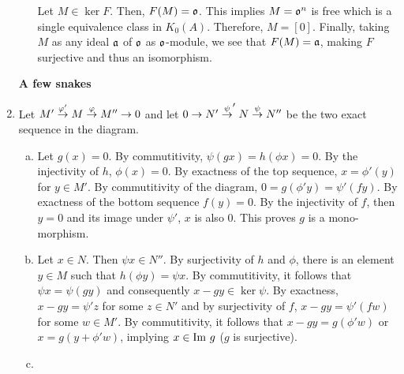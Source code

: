 \documentclass{article}
\theoremstyle{definition}
\theoremstyle{remark}
\begin{document}
\begin{enumerate}[(1)]
\begin{enumerate}[(a)]
                      Let $M \in \ker F$. Then, $F(M) = \mathfrak{o}$. This implies $M = \mathfrak{o}^{n}$ is free which is a single equivalence class in $K_0(A)$. Therefore, $M = [0]$. Finally, taking $M$ as any ideal $\mathfrak{a}$ of $\mathfrak{o}$ as $\mathfrak{o}$-module, we see that $F(M) = \mathfrak{a}$, making $F$ surjective and thus an isomorphism.

        \end{enumerate}

        \textbf{A few snakes}
  \item

        Let $M' \overset{\varphi'}{\to} M \overset{\varphi}{\to}  M'' \to 0$ and let $0 \to N' \overset{\psi}{\to}' N \overset{\psi}{\to} N''$ be the two exact sequence in the diagram.
        \begin{enumerate}[(a)]
          \item Let $g(x) = 0$. By commutitivity, $\psi(gx) = h(\phi x) =  0$. By the injectivity of $h$, $\phi(x) = 0$. By exactness of the top sequence, $x = \phi'(y)$ for $y \in M'$. By commutitivity of the diagram, $0 = g(\phi' y) = \psi'(fy)$. By exactness of the bottom sequence $f(y) = 0$. By the injectivity of $f$, then $y = 0$ and its image under $\psi'$, $x$ is also $0$. This proves $g$ is a mono-morphism.

          \item Let $x \in N$. Then $\psi x \in N''$. By surjectivity of $h$ and $\phi$, there is an element $y \in M$ such that $h(\phi y) = \psi x$. By commutitivity, it follows that $\psi x = \psi(g y)$ and consequently $x - g y \in \ker \psi$. By exactness, $x - g y = \psi' z$ for some $z \in N'$ and by surjectivity of $f$, $x - g y = \psi'(f w)$ for some $w \in M'$. By commutitivity, it follows that $x - gy = g(\phi' w)$ or $x = g(y + \phi' w)$, implying $x \in \mathrm{Im}\  g$ ($g$ is surjective).

          \item

        \end{enumerate}

\end{enumerate}
\end{document}
